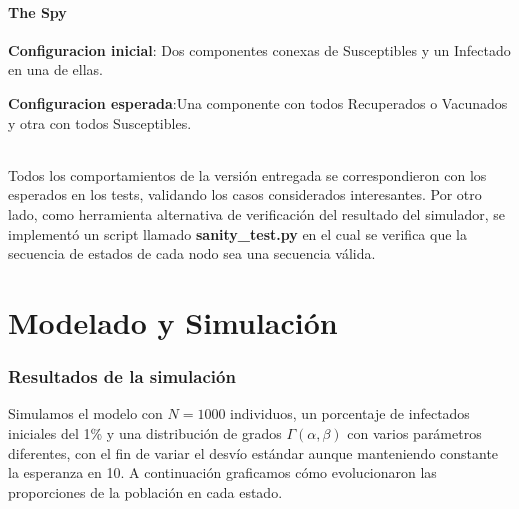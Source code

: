 \documentclass[10pt,a4paper]{article}
\begin{document}
\subsection*{The Spy}
\textbf{Configuracion inicial}: Dos componentes conexas de Susceptibles y un Infectado en una de ellas.


\textbf{Configuracion esperada}:Una componente con todos Recuperados o Vacunados y otra con todos Susceptibles.

\paragraph{}
Todos los comportamientos de la versión entregada se correspondieron con los esperados en los tests, validando los casos considerados interesantes. Por otro lado, como herramienta alternativa de verificación del resultado del simulador, se implementó un script llamado \textbf{sanity\_test.py} en el cual se verifica que la secuencia de estados de cada nodo sea una secuencia válida. 

\part*{Modelado y Simulaci\'on}
\section*{Resultados de la simulaci\'on}

Simulamos el modelo con $N=1000$ individuos, un porcentaje de infectados iniciales del 1\% y una distribuci\'on de grados $\Gamma(\alpha,\beta)$ con varios par\'ametros diferentes, con el fin de variar el desv\'io est\'andar aunque manteniendo constante la esperanza en 10. A continuaci\'on graficamos c\'omo evolucionaron las proporciones de la poblaci\'on en cada estado.
\end{document}
